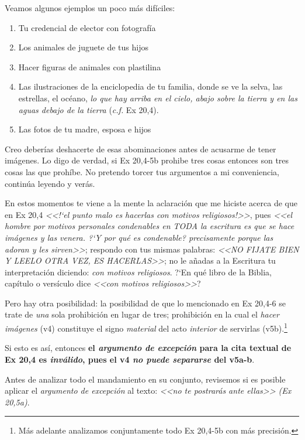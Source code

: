 \documentclass{article}
\begin{document}
Veamos algunos ejemplos un poco m\'as dif\'{i}ciles:

\begin{enumerate}
\item Tu credencial de elector con fotograf\'{i}a
\item Los animales de juguete de tus hijos
\item Hacer figuras de animales con plastilina
\item Las ilustraciones de la enciclopedia de tu familia, donde se ve la selva, las estrellas, el oc\'eano, \emph{lo que hay arriba en el cielo, abajo sobre la tierra y en las aguas debajo de la tierra} (\emph{c.f.} Ex 20,4).
\item Las fotos de tu madre, esposa e hijos
\end{enumerate}

\noindent
Creo deber\'{i}as deshacerte de esas abominaciones antes de acusarme de tener im\'agenes. Lo digo de verdad, si Ex 20,4-5b prohibe tres cosas entonces son tres cosas las que proh\'{i}be. No pretendo torcer tus argumentos a mi conveniencia, contin\'ua leyendo y ver\'as.

En estos momentos te viene a la mente la aclaraci\'on que me hiciste acerca de que en Ex 20,4 \emph{<<!`el punto malo es hacerlas con motivos religiosos!>>}, pues \emph{<<el hombre por motivos personales condenables en TODA la escritura es que se hace imágenes y las venera. ?`Y por qu\'e es condenable? precisamente porque las adoran y les sirven>>}; respondo con tus mismas palabras: \emph{<<NO FIJATE BIEN Y LEELO OTRA VEZ, ES HACERLAS>>}; no le a\~nadas a la Escritura tu interpretaci\'on diciendo: \emph{con motivos religiosos}. ?`En qu\'e libro de la Biblia, cap\'{i}tulo o vers\'{i}culo dice \emph{<<con motivos religiosos>>}?

Pero hay otra posibilidad: la posibilidad de que lo mencionado en Ex 20,4-6 se trate de \emph{una} sola prohibici\'on en lugar de tres; prohibici\'on en la cual el \emph{hacer im\'agenes} (v4) constituye el signo \emph{material} del acto \emph{interior} de servirlas (v5b).\footnote{M\'as adelante analizamos conjuntamente todo Ex 20,4-5b con m\'as precisi\'on.}

Si esto es as\'{i}, entonces \textbf{el \emph{argumento de excepci\'on} para la cita textual de Ex 20,4 es \emph{inv\'alido}, pues el v4 \emph{no puede separarse} del v5a-b}.

Antes de analizar todo el mandamiento en su conjunto, revisemos si es posible aplicar el \emph{argumento de excepci\'on} al texto: \emph{<<no te postrar\'as ante ellas>> (Ex 20,5a)}.
\end{document}

